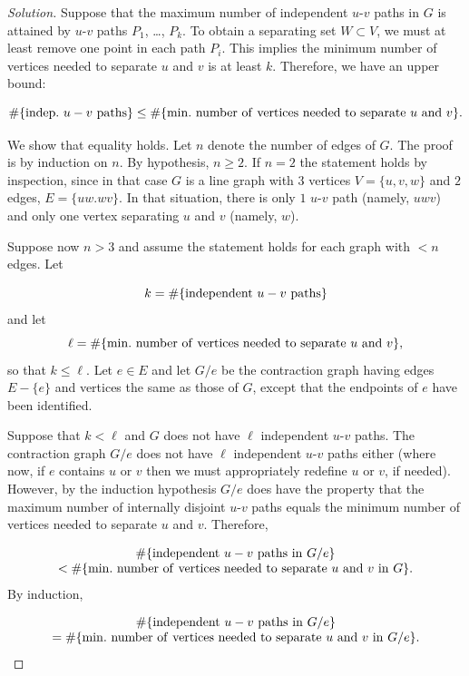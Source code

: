 \begin{proof}[Solution]
Suppose that the maximum number of independent $u$-$v$ paths in
$G$ is attained by $u$-$v$ paths $P_1$, \dots, $P_k$.
To obtain a separating set $W\subset V$, we must at least remove
one point in each path $P_i$. This implies
the minimum number of vertices needed to separate $u$ and $v$
is at least $k$. Therefore, we have an upper bound:

\[
\#\{ {\rm indep.}\ u-v\ {\rm paths}\}
\leq
\# \{{\rm min.\ number \ of\ vertices\ needed\ to\ separate}\ u\ 
{\rm and}\  v\}.
\]

We show that equality holds. Let $n$ denote the number
of edges of $G$. The proof is by induction on $n$. By hypothesis,
$n\geq 2$.
If $n=2$ the statement holds by inspection, since in that case 
$G$ is a line graph with $3$ vertices 
$V=\{u,v,w\}$ and $2$ edges, $E=\{uw.wv\}$. In that situation,
there is only $1$ $u$-$v$ path 
(namely, $uwv$) and only one vertex separating $u$ and $v$
(namely, $w$).

Suppose now $n>3$ and assume the statement holds for each
graph with $<n$ edges. Let

\[
k = \#\{ {\rm independent}\ u-v\ {\rm paths}\}
\]
and let
\[
\ell = 
\# \{{\rm min.\ number \ of\ vertices\ needed\ to\ separate}\ 
u\ {\rm and}\  v\},
\]
so that $k\leq \ell$. Let $e\in E$ and let $G/e$ be the 
contraction graph having edges $E-\{e\}$ and 
vertices the same as those of $G$, except that
the endpoints of $e$ have been identified.

Suppose that $k<\ell$ and $G$ does not have $\ell$
independent $u$-$v$ paths. The contraction
graph $G/e$ does not have $\ell$
independent $u$-$v$ paths either (where
now, if $e$ contains $u$ or $v$ then we must 
appropriately redefine $u$ or $v$, if needed).
However, by the induction hypothesis
$G/e$ does have the property that
the maximum number of internally disjoint $u$-$v$ paths 
equals the minimum number of vertices needed to separate $u$ and $v$.
Therefore,

\[
\begin{array}{c}
\#\{ {\rm independent}\ u-v\ {\rm paths\ in}\ G/e\}\\
< 
\# \{{\rm min.\ number \ of\ vertices\ needed\ to\ separate}
\ u\ {\rm and}\  v\ {\rm in}\ G\}.
\end{array}
\]
By induction,

\[
\begin{array}{c}
\#\{ {\rm independent\ }u-v{\rm \ paths\ in\ }G/e\}\\
=
\# \{{\rm min.\ number \ of\ vertices\ needed\ to\ separate\
}u{\rm \ and}\  v\ {\rm in\ }G/e\}.
\end{array}
\]


\end{proof}
